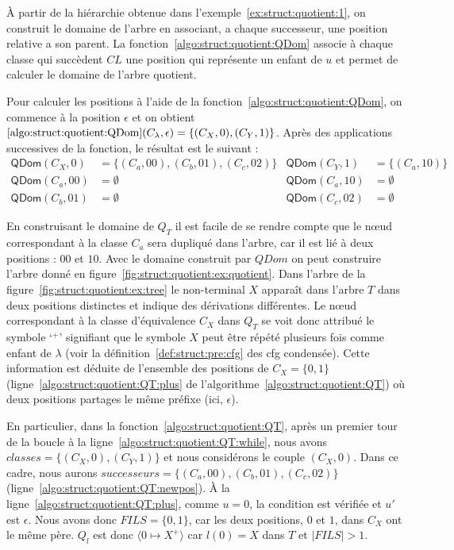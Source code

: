 \begin{example}%
    \label{ex:struct:quotient:2}
    À partir de la hiérarchie obtenue dans l'exemple~\ref{ex:struct:quotient:1}, on construit le domaine de l'arbre en associant, a chaque successeur, une position relative a son parent.
    La fonction~\ref{algo:struct:quotient:QDom} associe à chaque classe qui succèdent $CL$ une position qui représente un enfant de $u$ et permet de calculer le domaine de l'arbre quotient.

    Pour calculer les positions à l'aide de la fonction~\ref{algo:struct:quotient:QDom}, on commence à la position $\epsilon$ et on obtient $\ref{algo:struct:quotient:QDom}(C_\lambda, \epsilon) = \{(C_X, 0), (C_Y, 1)\}$.
    Après des applications successives de la fonction, le résultat est le suivant :
    \begin{align*}
        \textsf{QDom}(C_X, 0)  & = \{(C_a, 00), (C_b, 01), (C_c, 02)\} & \textsf{QDom}(C_Y, 1)  & = \{(C_a, 10)\} \\
        \textsf{QDom}(C_a, 00) & = \emptyset                           & \textsf{QDom}(C_a, 10) & = \emptyset     \\
        \textsf{QDom}(C_b, 01) & = \emptyset                           & \textsf{QDom}(C_c, 02) & = \emptyset
    \end{align*}

    En construisant le domaine de $Q_T$ il est facile de se rendre compte que le nœud correspondant à la classe $C_a$ sera dupliqué dans l'arbre, car il est lié à deux positions : $00$ et $10$.
    Avec le domaine construit par $QDom$ on peut construire l'arbre donné en figure~\ref{fig:struct:quotient:ex:quotient}.
    Dans l'arbre de la figure~\ref{fig:struct:quotient:ex:tree} le non-terminal $X$ apparaît dans l'arbre $T$ dans deux positions distinctes et indique des dérivations différentes.
    Le nœud correspondant à la classe d'équivalence $C_X$ dans $Q_T$ se voit donc attribué le symbole `${}^+$' signifiant que le symbole $X$ peut être répété plusieurs fois comme enfant de $\lambda$ (voir la définition~\ref{def:struct:pre:cfg} des \gls{cfg} condensée).
    Cette information est déduite de l'ensemble des positions de $C_X = \{0, 1\}$ (ligne~\ref{algo:struct:quotient:QT:plus} de l'algorithme~\ref{algo:struct:quotient:QT}) où deux positions partages le même préfixe (ici, $\epsilon$).
    
    En particulier, dans la fonction~\ref{algo:struct:quotient:QT}, après un premier tour de la boucle  à la ligne~\ref{algo:struct:quotient:QT:while}, nous avons $classes= \{(C_X, 0), (C_Y,1)\}$ et nous considérons le couple $(C_X, 0)$.
    Dans ce cadre, nous aurons $successeurs = \{(C_a, 00), (C_b,01), (C_c,02)\}$ (ligne~\ref{algo:struct:quotient:QT:newpos}).
    À la ligne~\ref{algo:struct:quotient:QT:plus}, comme $u = 0$, la condition est vérifiée et $u'$ est $\epsilon$.
    Nous avons donc $FILS = \{0,1\}$, car les deux positions, $0$ et $1$, dans $C_X$ ont le même père.
    $Q_l$ est donc $\langle 0 \mapsto X^+\rangle$ car $l(0) = X$ dans $T$ et $\lvert FILS \rvert > 1$.
\end{example}


